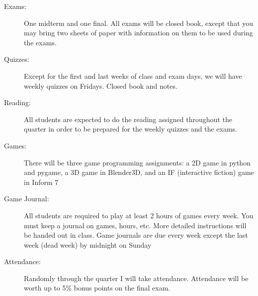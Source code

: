 \documentclass{article}
\begin{document}
\begin{description}
\item [Exams:] One midterm and one final.  All exams will be
  closed book, except that you may bring two sheets of paper with
  information on them to be used during the exams.

\item [Quizzes:] Except for the first and last weeks of class and
  exam days, we  will have weekly quizzes on Fridays.  Closed book and
  notes. 

\item [Reading:] All students are expected to do the 
  reading assigned throughout the quarter in order to be prepared for
  the weekly quizzes and the exams.

\item [Games:] There will be three game programming
  assignments:  a 2D game in python and pygame, a 3D game in Blender3D,
  and an IF (interactive fiction) game in Inform 7

\item [Game Journal:] All students are required to play at least 2
  hours of games every week.  You must keep a journal on games, hours,
  etc.  More detailed instructions will be handed out in class. Game
  journals are due every week except the last week (dead week) by
  midnight on Sunday

\item[Attendance:]  Randomly through the quarter I will take
  attendance.  Attendance will be worth up to 5\% bonus points on the
  final exam.

\end{description}
\end{document}
